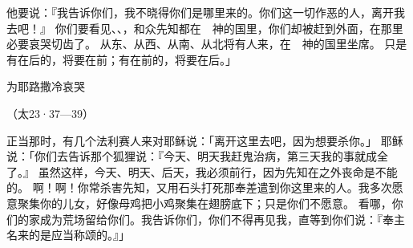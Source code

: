 {他要说：『我告诉你们，我不晓得你们是哪里来的。你们这一切作恶的人，离开我去吧！』
你们要看见{}、{}、{}，和众先知都在　神的国里，你们却被赶到外面，在那里必要哀哭切齿了。
从东、从西、从南、从北将有人来，在　神的国里坐席。
只是有在后的，将要在前；有在前的，将要在后。」
\par }{\SH 为耶路撒冷哀哭
\par }{\R （太23·37—39）
\par }{\PP {}正当那时，有几个法利赛人来对耶稣说：「离开这里去吧，因为{}想要杀你。」
耶稣说：「你们去告诉那个狐狸说：『今天、明天我赶鬼治病，第三天我的事就成全了。』
虽然这样，今天、明天、后天，我必须前行，因为先知在{}之外丧命是不能的。
啊！{}啊！你常杀害先知，又用石头打死那奉差遣到你这里来的人。我多次愿意聚集你的儿女，好像母鸡把小鸡聚集在翅膀底下；只是你们不愿意。
看哪，你们的家成为荒场留给你们。我告诉你们，{}你们不得再见我，直等到你们说：『奉主名来的是应当称颂的。』」

}
